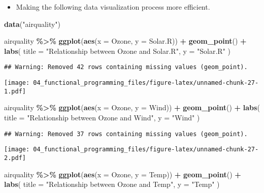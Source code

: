 \documentclass[
]{book}
\newenvironment{Shaded}{\begin{snugshade}}{\end{snugshade}}
\newcommand{\DataTypeTok}[1]{\textcolor[rgb]{0.13,0.29,0.53}{#1}}
\newcommand{\KeywordTok}[1]{\textcolor[rgb]{0.13,0.29,0.53}{\textbf{#1}}}
\newcommand{\NormalTok}[1]{#1}
\newcommand{\OperatorTok}[1]{\textcolor[rgb]{0.81,0.36,0.00}{\textbf{#1}}}
\newcommand{\StringTok}[1]{\textcolor[rgb]{0.31,0.60,0.02}{#1}}
\providecommand{\tightlist}{%
  \setlength{\itemsep}{0pt}\setlength{\parskip}{0pt}}
\begin{document}
\begin{itemize}
\tightlist
\item
  Making the following data visualization process more efficient.
\end{itemize}

\begin{Shaded}
\begin{Highlighting}[]
\KeywordTok{data}\NormalTok{(}\StringTok{"airquality"}\NormalTok{)}

\NormalTok{airquality }\OperatorTok{\%\textgreater{}\%}
\StringTok{  }\KeywordTok{ggplot}\NormalTok{(}\KeywordTok{aes}\NormalTok{(}\DataTypeTok{x =}\NormalTok{ Ozone, }\DataTypeTok{y =}\NormalTok{ Solar.R)) }\OperatorTok{+}
\StringTok{  }\KeywordTok{geom\_point}\NormalTok{() }\OperatorTok{+}
\StringTok{  }\KeywordTok{labs}\NormalTok{(}
    \DataTypeTok{title =} \StringTok{"Relationship between Ozone and Solar.R"}\NormalTok{,}
    \DataTypeTok{y =} \StringTok{"Solar.R"}
\NormalTok{  )}
\end{Highlighting}
\end{Shaded}

\begin{verbatim}
## Warning: Removed 42 rows containing missing values (geom_point).
\end{verbatim}

\texttt{[image: 04\_functional\_programming\_files/figure-latex/unnamed-chunk-27-1.pdf]}

\begin{Shaded}
\begin{Highlighting}[]
\NormalTok{airquality }\OperatorTok{\%\textgreater{}\%}
\StringTok{  }\KeywordTok{ggplot}\NormalTok{(}\KeywordTok{aes}\NormalTok{(}\DataTypeTok{x =}\NormalTok{ Ozone, }\DataTypeTok{y =}\NormalTok{ Wind)) }\OperatorTok{+}
\StringTok{  }\KeywordTok{geom\_point}\NormalTok{() }\OperatorTok{+}
\StringTok{  }\KeywordTok{labs}\NormalTok{(}
    \DataTypeTok{title =} \StringTok{"Relationship between Ozone and Wind"}\NormalTok{,}
    \DataTypeTok{y =} \StringTok{"Wind"}
\NormalTok{  )}
\end{Highlighting}
\end{Shaded}

\begin{verbatim}
## Warning: Removed 37 rows containing missing values (geom_point).
\end{verbatim}

\texttt{[image: 04\_functional\_programming\_files/figure-latex/unnamed-chunk-27-2.pdf]}

\begin{Shaded}
\begin{Highlighting}[]
\NormalTok{airquality }\OperatorTok{\%\textgreater{}\%}
\StringTok{  }\KeywordTok{ggplot}\NormalTok{(}\KeywordTok{aes}\NormalTok{(}\DataTypeTok{x =}\NormalTok{ Ozone, }\DataTypeTok{y =}\NormalTok{ Temp)) }\OperatorTok{+}
\StringTok{  }\KeywordTok{geom\_point}\NormalTok{() }\OperatorTok{+}
\StringTok{  }\KeywordTok{labs}\NormalTok{(}
    \DataTypeTok{title =} \StringTok{"Relationship between Ozone and Temp"}\NormalTok{,}
    \DataTypeTok{y =} \StringTok{"Temp"}
\NormalTok{  )}
\end{Highlighting}
\end{Shaded}
\end{document}
